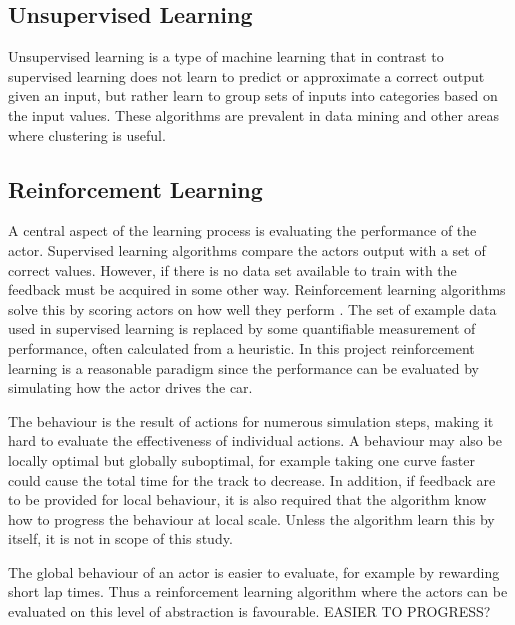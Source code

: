 \subsection{Unsupervised Learning}
Unsupervised learning is a type of machine learning that in contrast to supervised learning does not learn to predict or approximate a correct output given an input, but rather learn to group sets of inputs into categories based on the input values. These algorithms are prevalent in data mining and other areas where clustering is useful. 



\subsection{Reinforcement Learning}
A central aspect of the learning process is evaluating the performance of the actor. Supervised learning algorithms compare the actors output with a set of correct values. However, if there is no data set available to train with the feedback must be acquired in some other way. Reinforcement learning algorithms solve this by scoring actors on how well they perform \cite{whiteson}. The set of example data used in supervised learning is replaced by some quantifiable measurement of performance, often calculated from a heuristic. In this project reinforcement learning is a reasonable paradigm since the performance can be evaluated by simulating how the actor drives the car.

The behaviour is the result of actions for numerous simulation steps, making it hard to evaluate the effectiveness of individual actions. A behaviour may also be locally optimal but globally suboptimal, for example taking one curve faster could cause the total time for the track to decrease. In addition, if feedback are to be provided for local behaviour, it is also required that the algorithm know how to progress the behaviour at local scale. Unless the algorithm learn this by itself, it is not in scope of this study. 

The global behaviour of an actor is easier to evaluate, for example by rewarding short lap times. Thus a reinforcement learning algorithm where the actors can be evaluated on this level of abstraction is favourable. EASIER TO PROGRESS?


